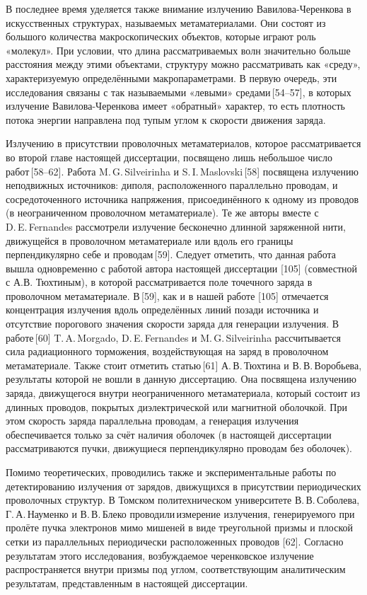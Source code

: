 В последнее время уделяется также внимание излучению Вавилова-Черенкова в искусственных структурах, называемых метаматериалами. Они состоят из большого количества макроскопических объектов, которые играют роль «молекул». При условии, что длина рассматриваемых волн значительно больше расстояния между этими объектами, структуру можно рассматривать как «среду», характеризуемую определёнными макропараметрами. В первую очередь, эти исследования связаны с так называемыми «левыми» средами [54–57], в которых излучение Вавилова-Черенкова имеет «обратный» характер, то есть плотность потока энергии направлена под тупым углом к скорости движения заряда.  

Излучению в присутствии проволочных метаматериалов, которое рассматривается во второй главе настоящей диссертации, посвящено лишь небольшое число работ [58–62]. Работа M. G. Silveirinha и S. I. Maslovski [58] посвящена излучению неподвижных источников: диполя, расположенного параллельно проводам, и сосредоточенного источника напряжения, присоединённого к одному из проводов (в неограниченном проволочном метаматериале). Те же авторы вместе с D. E. Fernandes рассмотрели излучение бесконечно длинной заряженной нити, движущейся в проволочном метаматериале или вдоль его границы перпендикулярно себе и проводам [59]. Следует отметить, что данная работа вышла одновременно с работой автора настоящей диссертации [105] (совместной с А.В. Тюхтиным), в которой рассматривается поле точечного заряда в проволочном метаматериале. В [59], как и в нашей работе [105] отмечается концентрация излучения вдоль определённых линий позади источника и отсутствие порогового значения скорости заряда для генерации излучения. В работе [60] T. A. Morgado, D. E. Fernandes и M. G. Silveirinha рассчитывается сила радиационного торможения, воздействующая на заряд в проволочном метаматериале. Также стоит отметить статью [61] А. В. Тюхтина и В. В. Воробьева, результаты которой не вошли в данную диссертацию. Она посвящена излучению заряда, движущегося внутри неограниченного метаматериала, который состоит из длинных проводов, покрытых диэлектрической или магнитной оболочкой. При этом скорость заряда параллельна проводам, а генерация излучения обеспечивается только за счёт наличия оболочек (в настоящей диссертации рассматриваются пучки, движущиеся перпендикулярно проводам без оболочек).  

Помимо теоретических, проводились также и экспериментальные работы по детектированию излучения от зарядов, движущихся в присутствии периодических проволочных структур. В Томском политехническом университете В. В. Соболева, Г. А. Науменко и В. В. Блеко проводили измерение излучения, генерируемого при пролёте пучка электронов мимо мишеней в виде треугольной призмы и плоской сетки из параллельных периодически расположенных проводов [62]. Согласно результатам этого исследования, возбуждаемое черенковское излучение распространяется внутри призмы под углом, соответствующим аналитическим результатам, представленным в настоящей диссертации.  


